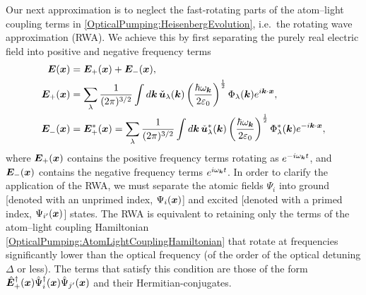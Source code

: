 Our next approximation is to neglect the fast-rotating parts of the atom--light coupling terms in \eqref{OpticalPumping:HeisenbergEvolution}, i.e.\ the rotating wave approximation (RWA).  We achieve this by first separating the purely real electric field into positive and negative frequency terms
\begin{align}
    \bm{E}(\bm{x}) &= \bm{E}_+(\bm{x}) + \bm{E}_-(\bm{x}), \\
    \bm{E}_+(\bm{x}) &= \sum_\lambda \frac{1}{(2\pi)^{3/2}} \int d \bm{k}\, \check{\bm{u}}_\lambda(\bm{k}) \left(\frac{\hbar \omega_{\bm{k}}}{2 \varepsilon_0}\right)^{\frac{1}{2}} \Phi_\lambda(\bm{k}) e^{i \bm{k} \cdot \bm{x}},\\
    \bm{E}^{\phantom{*}}_-(\bm{x}) &= \bm{E}_+^*(\bm{x}) = \sum_\lambda \frac{1}{(2\pi)^{3/2}} \int d \bm{k}\, \check{\bm{u}}^*_\lambda(\bm{k}) \left(\frac{\hbar \omega_{\bm{k}}}{2 \varepsilon_0}\right)^{\frac{1}{2}} \Phi^*_\lambda(\bm{k}) e^{-i \bm{k} \cdot \bm{x}},
\end{align}
where $\bm{E}_+(\bm{x})$ contains the positive frequency terms rotating as $e^{-i \omega_{\bm{k}} t}$, and $\bm{E}_-(\bm{x})$ contains the negative frequency terms $e^{i \omega_{\bm{k}} t}$.  In order to clarify the application of the RWA, we must separate the atomic fields $\Psi_i$ into ground [denoted with an unprimed index, $\Psi_i(\bm{x})$] and excited [denoted with a primed index, $\Psi_{i'}(\bm{x})$] states.  The RWA is equivalent to retaining only the terms of the atom--light coupling Hamiltonian \eqref{OpticalPumping:AtomLightCouplingHamiltonian} that rotate at frequencies significantly lower than the optical frequency (of the order of the optical detuning $\Delta$ or less).  The terms that satisfy this condition are those of the form $\hat{\bm{E}}_+^\dagger(\bm{x})\hat{\Psi}_i^\dagger(\bm{x}) \hat{\Psi}_{j'}(\bm{x})$ and their Hermitian-conjugates.

